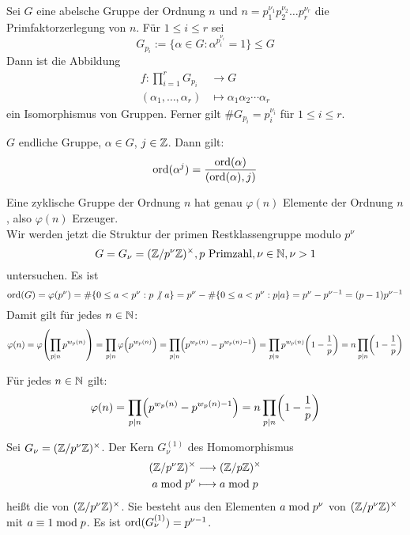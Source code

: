 \begin{falko} \label{F4.2}
	Sei $G$ eine abelsche Gruppe der Ordnung $n$ und $n = p_1^{\nu_1} p_2^{\nu_2} \dots p_r^{\nu_r}$ die Primfaktorzerlegung von $n$. Für $1 \leq i \leq r$ sei
	\[ G_{p_i} := \{\alpha \in G : \alpha^{p_i^{\nu_i}} = 1 \} \leq G \]
	Dann ist die Abbildung
	\begin{equation}
	\begin{aligned}
		f\colon \prod_{i=1}^{r} G_{p_i} &\longrightarrow G \\
		(\alpha_1,\dots,\alpha_r) &\longmapsto \alpha_1 \alpha_2 \cdots \alpha_r \label{eq_F4.2}
	\end{aligned}
	\end{equation}
	ein Isomorphismus von Gruppen. Ferner gilt $\# G_{p_i} = p_i^{\nu_i}$ für $1 \leq i \leq r$.
\end{falko}

	$G$ endliche Gruppe, $\alpha \in G$, $j \in \mathbb{Z}$. Dann gilt:
	\[ \operatorname{ord}(\alpha^j) = \frac{\operatorname{ord}(\alpha)}{(\operatorname{ord}(\alpha),j)} \]
	
	Eine zyklische Gruppe der Ordnung $n$ hat genau $\varphi(n)$ Elemente der Ordnung $n$, also $\varphi(n)$ Erzeuger. \\
	
	
Wir werden jetzt die Struktur der primen Restklassengruppe modulo $p^\nu$ 
\[ G = G_\nu = (\mathbb{Z}/p^\nu\mathbb{Z})^\times, p \text{ Primzahl}, \nu \in \mathbb{N}, \nu > 1 \]
untersuchen. Es ist
\[ \operatorname{ord}(G) = \varphi(p^\nu) = \# \{0 \leq a < p^\nu : p \not | \ a \} = p^\nu - \# \{0 \leq a < p^\nu : p | a \} = p^\nu - p^{\nu-1} = (p-1) p^{\nu-1} \]
Damit gilt für jedes $n \in \mathbb{N}$:
\[ \varphi(n) = \varphi \enbrace*{ \prod_{p|n} p^{w_p(n)}} = \prod_{p | n} \varphi \enbrace*{p^{w_p(n)}} = \prod_{p | n} \enbrace*{p^{w_p(n)}-p^{w_p(n)-1}} = \prod_{p | n} p^{w_p(n)} \enbrace*{1- \frac{1}{p}} = n \prod_{p | n} \enbrace*{1- \frac{1}{p}}\]

\begin{falko} \label{F4.3}
	Für jedes $n \in \mathbb{N}$ gilt:
	\[ \varphi(n) = \prod_{p|n} \enbrace*{p^{w_p(n)} - p^{w_p(n)-1}} = n \prod_{p | n} \enbrace*{1 - \frac{1}{p}} \]
\end{falko}

\begin{defn}
	Sei $G_\nu = (\mathbb{Z}/p^\nu\mathbb{Z})^\times$. Der Kern $G_\nu^{(1)}$ des Homomorphismus 
	\begin{equation}
	\begin{aligned}
		(\mathbb{Z}/p^\nu\mathbb{Z})^\times &\longrightarrow (\mathbb{Z}/p\mathbb{Z})^\times \\
		a \bmod p^\nu &\longmapsto a \bmod p
	\end{aligned}
	\end{equation}
	heißt die  von $(\mathbb{Z}/p^\nu \mathbb{Z})^\times$. Sie besteht aus den Elementen $a \bmod p^\nu$ von $(\mathbb{Z}/p^\nu\mathbb{Z})^\times$ mit $a \equiv 1 \bmod p$. Es ist $\operatorname{ord}(G_\nu^{(1)}) = p^{\nu-1}$.
\end{defn}

